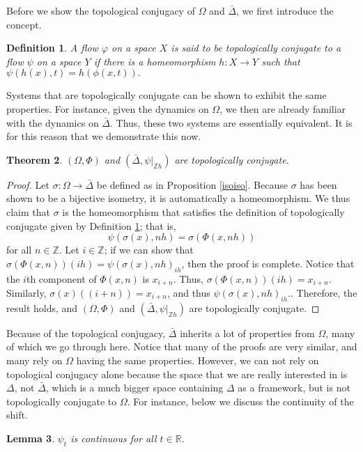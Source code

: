 \documentclass[11pt]{article}
\newtheorem{thm}{Theorem}
\newtheorem{defn}[thm]{Definition}
\newtheorem{lem}[thm]{Lemma}
\newcommand{\bpf}{\begin{proof}}
\newcommand{\epf}{\end{proof}\ms}
\newcommand{\ms}{\medskip}
\begin{document}
Before we show the topological conjugacy of $\Omega$ and $\bar\Delta$, we first introduce the concept.
\begin{defn}\label{topconj}
A flow $\varphi$ on a space $X$ is said to be topologically conjugate to a flow $\psi$ on a space $Y$ if there is a homeomorphism $h:X\rightarrow Y$ such that $\psi(h(x),t)=h(\phi(x,t)).$
\end{defn}
Systems that are topologically conjugate can be shown to exhibit the same properties.  For instance, given the dynamics on $\Omega$, we then are already familiar with the dynamics on $\bar\Delta$.  Thus, these two systems are essentially equivalent. It is for this reason that we demonstrate this now.

\begin{thm}
$(\Omega,\Phi)$ and $(\bar{\Delta},\psi|_{\mathbb{Z}h})$ are topologically conjugate.
\end{thm}
\bpf
Let $\sigma:\Omega\rightarrow\bar\Delta$ be defined as in Proposition \ref{isoiso}.  Because $\sigma$ has been shown to be a bijective isometry, it is automatically a homeomorphism.  We thus claim that $\sigma$ is the homeomorphism that satisfies the definition of topologically conjugate given by Definition \ref{topconj}; that is, 
$$\psi(\sigma(x),nh)=\sigma(\Phi(x,nh))$$
for all $n\in\mathbb{Z}.$ Let $i\in\mathbb{Z}$; if we can show that $\sigma(\Phi(x,n))(ih)=\psi(\sigma(x),nh)_{ih}$, then the proof is complete.  Notice that the $i$th component of $\Phi(x,n)$ is $x_{i+n}$.  Thus, $\sigma(\Phi(x,n))(ih)=x_{i+n}$.  Similarly, $\sigma(x)((i+n))=x_{i+n}$, and thus $\psi(\sigma(x),nh)_{ih}.$.  Therefore, the result holds, and $(\Omega,\Phi)$ and $(\bar{\Delta},\psi|_{\mathbb{Z}h})$ are topologically conjugate.
\epf

Because of the topological conjugacy, $\bar\Delta$ inherits a lot of properties from $\Omega$, many of which we go through here.  Notice that many of the proofs are very similar, and many rely on $\Omega$ having the same properties.  However, we can not rely on topological conjugacy alone because the space that we are really interested in is $\Delta$, not $\bar\Delta$, which is a much bigger space containing $\Delta$ as a framework, but is not topologically conjugate to $\Omega$.  For instance, below we discuss the continuity of the shift.



\begin{lem}\label{psicontinuous}
$\psi_t$ is continuous for all $t \in \mathbb{R}$.
\end{lem}
\end{document}
